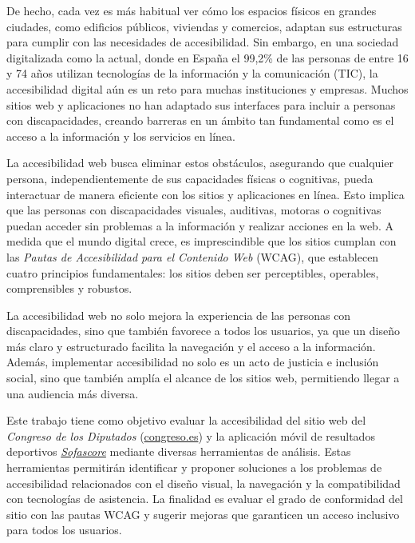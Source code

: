 \documentclass[]{article}
\begin{document}
De hecho, cada vez es más habitual ver cómo los espacios físicos en grandes ciudades, como edificios públicos, viviendas y comercios, adaptan sus estructuras para cumplir con las necesidades de accesibilidad. Sin embargo, en una sociedad digitalizada como la actual, donde en España el 99,2\% de las personas de entre 16 y 74 años utilizan tecnologías de la información y la comunicación (TIC), la accesibilidad digital aún es un reto para muchas instituciones y empresas. Muchos sitios web y aplicaciones no han adaptado sus interfaces para incluir a personas con discapacidades, creando barreras en un ámbito tan fundamental como es el acceso a la información y los servicios en línea.

La accesibilidad web busca eliminar estos obstáculos, asegurando que cualquier persona, independientemente de sus capacidades físicas o cognitivas, pueda interactuar de manera eficiente con los sitios y aplicaciones en línea. Esto implica que las personas con discapacidades visuales, auditivas, motoras o cognitivas puedan acceder sin problemas a la información y realizar acciones en la web. A medida que el mundo digital crece, es imprescindible que los sitios cumplan con las \textit{Pautas de Accesibilidad para el Contenido Web} (WCAG), que establecen cuatro principios fundamentales: los sitios deben ser perceptibles, operables, comprensibles y robustos.

La accesibilidad web no solo mejora la experiencia de las personas con discapacidades, sino que también favorece a todos los usuarios, ya que un diseño más claro y estructurado facilita la navegación y el acceso a la información. Además, implementar accesibilidad no solo es un acto de justicia e inclusión social, sino que también amplía el alcance de los sitios web, permitiendo llegar a una audiencia más diversa.

Este trabajo tiene como objetivo evaluar la accesibilidad del sitio web del \textit{Congreso de los Diputados} (\href{https://www.congreso.es/es/home}{congreso.es}) y la aplicación móvil de resultados deportivos \textit{\href{https://play.google.com/store/apps/details?id=com.sofascore.results&pcampaignid=web_share}{Sofascore}} mediante diversas herramientas de análisis. Estas herramientas permitirán identificar y proponer soluciones a los problemas de accesibilidad relacionados con el diseño visual, la navegación y la compatibilidad con tecnologías de asistencia. La finalidad es evaluar el grado de conformidad del sitio con las pautas WCAG y sugerir mejoras que garanticen un acceso inclusivo para todos los usuarios.
\end{document}
